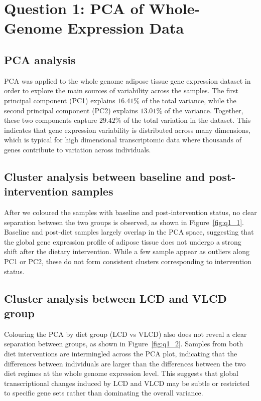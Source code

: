 \documentclass[11pt, a4paper]{article}
\begin{document}
\section{Question 1: PCA of Whole-Genome Expression Data}
\label{sec:q1}
\subsection{PCA analysis}
PCA was applied to the whole genome adipose tissue gene expression dataset in order to explore the main sources of variability across the samples. The first principal component (PC1) explains $16.41\%$ of the total variance, while the second principal component (PC2) explains $13.01\%$ of the variance. Together, these two components capture $29.42\%$ of the total variation in the dataset. This indicates that gene expression variability is distributed across many dimensions, which is typical for high dimensional transcriptomic data where thousands of genes contribute to variation across individuals.

\subsection{Cluster analysis between baseline and post-intervention samples}
After we coloured the samples with baseline and post-intervention status, no clear separation between the two groups is observed, as shown in Figure~\ref{fig:q1_1}. Baseline and post-diet samples largely overlap in the PCA space, suggesting that the global gene expression profile of adipose tissue does not undergo a strong shift after the dietary intervention. While a few sample appear as outliers along PC1 or PC2, these do not form consistent clusters corresponding to intervention status.

\subsection{Cluster analysis between LCD and VLCD group}
Colouring the PCA by diet group (LCD vs VLCD) also does not reveal a clear separation between groups, as shown in Figure~\ref{fig:q1_2}. Samples from both diet interventions are intermingled across the PCA plot, indicating that the differences between individuals are larger than the differences between the two diet regimes at the whole genome expression level. This suggests that global transcriptional changes induced by LCD and VLCD may be subtle or restricted to specific gene sets rather than dominating the overall variance.
\end{document}
